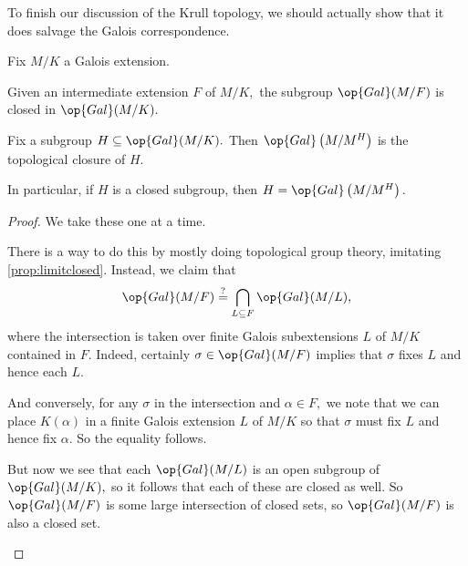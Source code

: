 To finish our discussion of the Krull topology, we should actually show that it does salvage the Galois correspondence.
\begin{theorem}
	Fix $M/K$ a Galois extension.
	\begin{listalph}
		\item Given an intermediate extension $F$ of $M/K,$ the subgroup $\op{Gal}(M/F)$ is closed in $\op{Gal}(M/K).$
		\item Fix a subgroup $H\subseteq\op{Gal}(M/K).$ Then $\op{Gal}\left(M/M^H\right)$ is the topological closure of $H.$
		\item In particular, if $H$ is a closed subgroup, then $H=\op{Gal}\left(M/M^H\right).$
	\end{listalph}
\end{theorem}
\begin{proof}
	We take these one at a time.
	\begin{listalph}
		\item There is a way to do this by mostly doing topological group theory, imitating \autoref{prop:limitclosed}. Instead, we claim that
		\[\op{Gal}(M/F)\stackrel?=\bigcap_{L\subseteq F}\op{Gal}(M/L),\]
		where the intersection is taken over finite Galois subextensions $L$ of $M/K$ contained in $F.$ Indeed, certainly $\sigma\in\op{Gal}(M/F)$ implies that $\sigma$ fixes $L$ and hence each $L.$
		
		And conversely, for any $\sigma$ in the intersection and $\alpha\in F,$ we note that we can place $K(\alpha)$ in a finite Galois extension $L$ of $M/K$ so that $\sigma$ must fix $L$ and hence fix $\alpha.$ So the equality follows.

		But now we see that each $\op{Gal}(M/L)$ is an open subgroup of $\op{Gal}(M/K),$ so it follows that each of these are closed as well. So $\op{Gal}(M/F)$ is some large intersection of closed sets, so $\op{Gal}(M/F)$ is also a closed set.
		


\end{listalph}
\end{proof}
